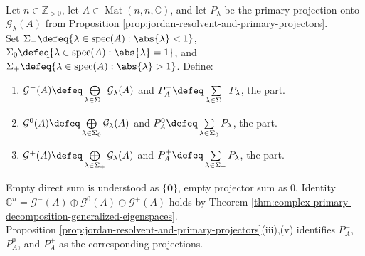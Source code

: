 \begin{definition} \label{def:unit-circle-primary-spectral-splitting} \\
Let $n\in\mathbb{Z}_{>0}$, let $A\in\operatorname{Mat}(n,n,\mathbb{C})$, and let $P_{\lambda}$ be the primary projection onto $\mathcal{G}_{\lambda}(A)$ from Proposition \ref{prop:jordan-resolvent-and-primary-projectors}.\\
Set $\Sigma_-\defeq\{\lambda\in\operatorname{spec}(A):\abs{\lambda}<1\}$, $\Sigma_0\defeq\{\lambda\in\operatorname{spec}(A):\abs{\lambda}=1\}$, and $\Sigma_+\defeq\{\lambda\in\operatorname{spec}(A):\abs{\lambda}>1\}$. Define:
\begin{enumerate}[label=(\roman*)]
\setlength{\itemsep}{0pt}
\item $\mathcal{G}^{-}(A)\defeq\bigoplus\limits_{\lambda\in\Sigma_-}\mathcal{G}_{\lambda}(A)$ and $P_A^{-}\defeq\sum\limits_{\lambda\in\Sigma_-}P_{\lambda}$, the  part.
\item $\mathcal{G}^{0}(A)\defeq\bigoplus\limits_{\lambda\in\Sigma_0}\mathcal{G}_{\lambda}(A)$ and $P_A^{0}\defeq\sum\limits_{\lambda\in\Sigma_0}P_{\lambda}$, the  part.
\item $\mathcal{G}^{+}(A)\defeq\bigoplus\limits_{\lambda\in\Sigma_+}\mathcal{G}_{\lambda}(A)$ and $P_A^{+}\defeq\sum\limits_{\lambda\in\Sigma_+}P_{\lambda}$, the  part.
\end{enumerate}
Empty direct sum is understood as $\{\mathbf{0}\}$, empty projector sum as $0$. Identity $\mathbb{C}^n=\mathcal{G}^{-}(A)\oplus\mathcal{G}^{0}(A)\oplus\mathcal{G}^{+}(A)$ holds by Theorem \ref{thm:complex-primary-decomposition-generalized-eigenspaces}.\\
Proposition \ref{prop:jordan-resolvent-and-primary-projectors}(iii),(v) identifies $P_A^{-}$, $P_A^{0}$, and $P_A^{+}$ as the corresponding projections.
\end{definition}

